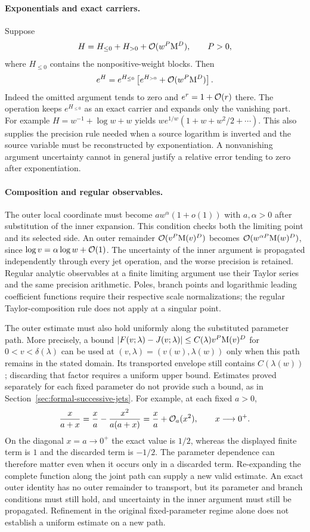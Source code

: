 \paragraph{Exponentials and exact carriers.}
Suppose
\[
 H=H_{\le0}+H_{>0}+\mathcal O(w^P\mathrm M^D),\qquad P>0,
\]
where $H_{\le0}$ contains the nonpositive-weight blocks. Then
\[
 e^H=e^{H_{\le0}}
 \left[e^{H_{>0}}+\mathcal O(w^P\mathrm M^D)\right].
\]
Indeed the omitted argument tends to zero and $e^r=1+\mathcal O(r)$ there.
The operation keeps $e^{H_{\le0}}$ as an exact carrier and expands only
the vanishing part. For example $H=w^{-1}+\log w+w$ yields
$w e^{1/w}(1+w+w^2/2+\cdots)$. This also supplies the precision rule
needed when a source logarithm is inverted and the source variable must
be reconstructed by exponentiation. A nonvanishing argument uncertainty cannot in general justify a relative error tending to zero after exponentiation.

\paragraph{Composition and regular observables.}
The outer local coordinate must become $a w^\alpha(1+o(1))$ with
$a,\alpha>0$ after substitution of the inner expansion. This condition
checks both the limiting point and its selected side. An outer remainder
$\mathcal O(v^P\mathrm M(v)^D)$ becomes $\mathcal O(w^{\alpha P}\mathrm M(w)^D)$, since
$\log v=\alpha\log w+\mathcal O(1)$. The uncertainty of the inner argument is
propagated independently through every jet operation, and the worse
precision is retained. Regular analytic observables at a finite limiting
argument use their Taylor series and the same precision arithmetic.
Poles, branch points and logarithmic leading coefficient functions require
their respective scale normalizations; the regular Taylor-composition rule does not apply at a singular point.

The outer estimate must also hold uniformly along the substituted parameter
path. More precisely, a bound
$|F(v;\lambda)-J(v;\lambda)|\le C(\lambda)v^P\mathrm M(v)^D$
for $0<v<\delta(\lambda)$ can be used at
$(v,\lambda)=(v(w),\lambda(w))$ only when this path remains in the stated
domain. Its transported envelope still contains $C(\lambda(w))$;
discarding that factor requires a uniform upper bound. Estimates proved
separately for each fixed parameter do not provide such a bound, as in
Section~\ref{sec:formal-successive-jets}. For example, at each fixed $a>0$,
\[
 \frac{x}{a+x}=\frac{x}{a}
   -\frac{x^2}{a(a+x)}
   =\frac{x}{a}+\mathcal O_a(x^2),\qquad x\longrightarrow0^+.
\]
On the diagonal $x=a\longrightarrow0^+$ the exact value is $1/2$, whereas
the displayed finite term is $1$ and the discarded term is $-1/2$.
The parameter dependence can therefore matter even when it occurs only
in a discarded term. Re-expanding the complete function along the joint
path can supply a new valid estimate. An exact outer identity has no
outer remainder to transport, but its parameter and branch conditions
must still hold, and uncertainty in the inner argument must still be
propagated. Refinement in the original fixed-parameter regime alone
does not establish a uniform estimate on a new path.

